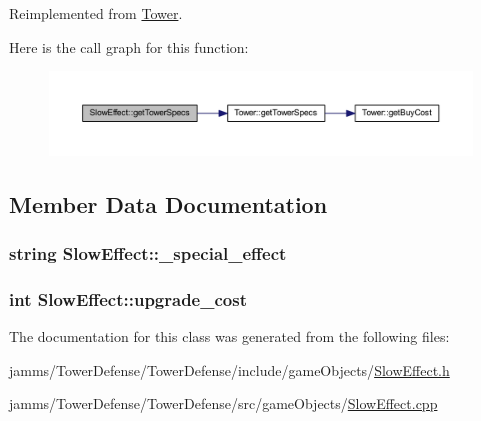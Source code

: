 Reimplemented from \hyperlink{class_tower_a2427fab36824f8ec98273cb5e563e0c9}{Tower}.



Here is the call graph for this function\+:\nopagebreak
\begin{figure}[H]
\begin{center}
\leavevmode
\includegraphics[width=350pt]{class_slow_effect_aaa162ffbad9bc163a53b0927b035dcb8_cgraph}
\end{center}
\end{figure}




\subsection{Member Data Documentation}
\hypertarget{class_slow_effect_a8e3148b27be8020c4216d61d5f783194}{
\subsubsection[{\+\_\+special\+\_\+effect}]{\setlength{\rightskip}{0pt plus 5cm}string Slow\+Effect\+::\+\_\+special\+\_\+effect\hspace{0.3cm}{\ttfamily [private]}}}\label{class_slow_effect_a8e3148b27be8020c4216d61d5f783194}
\hypertarget{class_slow_effect_aa96bd2eca9e2b835afed17e9986d9845}{
\subsubsection[{upgrade\+\_\+cost}]{\setlength{\rightskip}{0pt plus 5cm}int Slow\+Effect\+::upgrade\+\_\+cost\hspace{0.3cm}{\ttfamily [static]}}}\label{class_slow_effect_aa96bd2eca9e2b835afed17e9986d9845}


The documentation for this class was generated from the following files\+:\begin{DoxyCompactItemize}
\item 
jamms/\+Tower\+Defense/\+Tower\+Defense/include/game\+Objects/\hyperlink{_slow_effect_8h}{Slow\+Effect.\+h}\item 
jamms/\+Tower\+Defense/\+Tower\+Defense/src/game\+Objects/\hyperlink{_slow_effect_8cpp}{Slow\+Effect.\+cpp}\end{DoxyCompactItemize}
